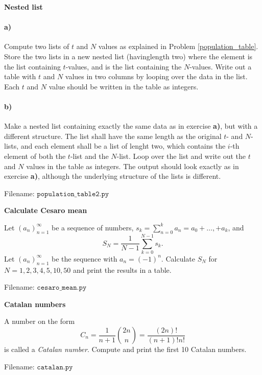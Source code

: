 \begin{Problem}{\textbf{Nested list}}\label{population_table2}

\paragraph{a)} Compute two lists of $t$ and $N$ values as explained in Problem
\ref{population_table}. Store the two lists in a new nested list  (havinglength
two) where the element  is the list containing $t$-values,
and  is the list containing the $N$-values.
Write out a table
with $t$ and $N$ values in two columns by looping over the data in the 
list. Each $t$ and $N$ value should be written in the table as integers.

\paragraph{b)} Make a nested list  containing exactly the same data as in exercise
\textbf{a)}, but with a different structure.  The  list shall
have the same length as the original $t$- and $N$-lists,
and each element 
shall be a list of lenght two, which contains the $i$-th element of both the $t$-list and the $N$-list.
Loop over the  list and write out the $t$ and $N$
values in the table as integers. The output should look exactly as in exercise
\textbf{a)}, although the underlying structure of the lists is different.

Filename: $\texttt{population\_table2.py}$
\end{Problem}

\begin{Problem}{\textbf{Calculate Cesaro mean}}

\noindent Let $(a_n)_{n=1}^\infty$ be a sequence of numbers, $s_k=\sum_{n=0}^k a_n=a_0+\dots,+a_k$,
and
\begin{equation*}
    S_N = \frac{1}{N-1}\sum_{k=0}^{N-1} s_k.
\end{equation*}
Let $(a_n)_{n=1}^\infty$ be the sequence with $a_n=(-1)^n$.
Calculate $S_N$ for \newline $N=1, 2, 3, 4, 5, 10, 50$ and print the results in a table.

Filename: $\texttt{cesaro\_mean.py}$
\end{Problem}

\begin{Problem}{\textbf{Catalan numbers}}

\noindent A number on the form
\begin{equation*}
    C_n=\frac{1}{n+1}\binom{2n}{n}=\frac{(2n)!}{(n+1)!n!}
\end{equation*}
is called a \emph{Catalan number}. Compute and print the first 10 Catalan numbers.

Filename: $\texttt{catalan.py}$
\end{Problem}

